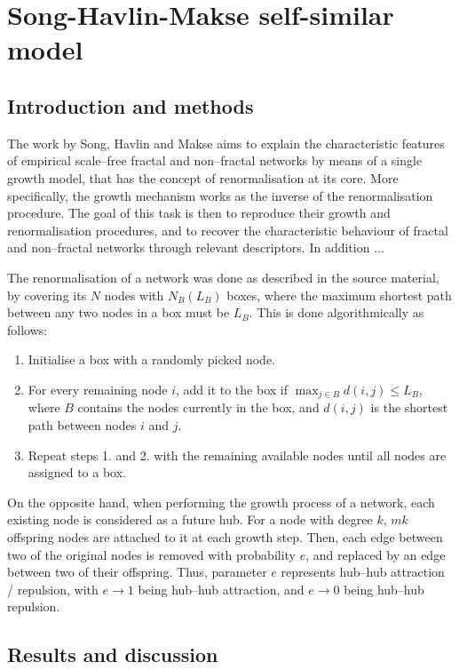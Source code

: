 \chapter{Song-Havlin-Makse self-similar model}


\section{Introduction and methods}
 
The work by Song, Havlin and Makse \cite{song2006origins} aims to explain the characteristic features of empirical scale--free fractal and non--fractal networks by means of a single growth model, that has the concept of renormalisation at its core. More specifically, the growth mechanism works as the inverse of the renormalisation procedure. The goal of this task is then to reproduce their growth and renormalisation procedures, and to recover the characteristic behaviour of fractal and non--fractal networks through relevant descriptors. In addition ...

The renormalisation of a network was done as described in the source material, by covering its $N$ nodes with $N_B(L_B)$ boxes, where the maximum shortest path between any two nodes in a box must be $L_B$. This is done algorithmically as follows:

\begin{enumerate}
	\item Initialise a box with a randomly picked node.
	\item For every remaining node $i$, add it to the box if $\max_{j\in B} d(i,j) \leq L_B$, where $B$ contains the nodes currently in the box, and $d(i,j)$ is the shortest path between nodes $i$ and $j$.
	\item Repeat steps 1. and 2. with the remaining available nodes until all nodes are assigned to a box.
\end{enumerate}

On the opposite hand, when performing the growth process of a network, each existing node is considered as a future hub. For a node with degree $k$, $mk$ offspring nodes are attached to it at each growth step. Then, each edge between two of the original nodes is removed with probability $e$, and replaced by an edge between two of their offspring. Thus, parameter $e$ represents hub--hub attraction / repulsion, with $e\rightarrow1$ being hub--hub attraction, and $e\rightarrow0$ being hub--hub repulsion.

\section{Results and discussion}

\lipsum[2-4]


\newpage
